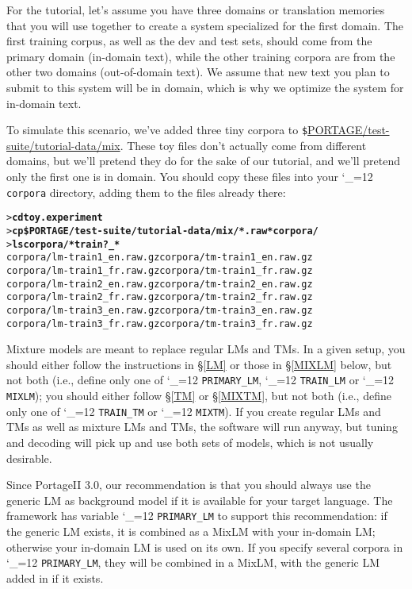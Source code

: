 \documentclass[11pt,letterpaper]{article}
\newcommand{\PS}{PortageII\xspace}
\def\code{\begingroup\catcode`\_=12 \codex}
\newcommand{\codex}[1]{\texttt{#1}\endgroup}
\begin{document}
For the tutorial, let's assume
you have three domains or translation memories that you will use
together to create a system specialized for the first domain.  The first
training corpus, as well as the dev and test sets, should come from the primary
domain (in-domain text), while the other training corpora are from the other two
domains (out-of-domain text).  We assume that new text you plan to submit to
this system will be in domain, which is why we optimize the system for
in-domain text.

To simulate this scenario, we've added three tiny corpora to
\verb"$"\url{PORTAGE/test-suite/tutorial-data/mix}.
These toy files don't actually come from different domains, but we'll pretend they do
for the sake of our tutorial, and we'll pretend only the first one is in
domain.  You should copy these files into your \code{corpora} directory, adding
them to the files already there:
\begin{small}
\begin{alltt}
   > \textbf{cd toy.experiment}
   > \textbf{cp \$PORTAGE/test-suite/tutorial-data/mix/*.raw* corpora/}
   > \textbf{ls corpora/*train?_*}
   corpora/lm-train1_en.raw.gz  corpora/tm-train1_en.raw.gz
   corpora/lm-train1_fr.raw.gz  corpora/tm-train1_fr.raw.gz
   corpora/lm-train2_en.raw.gz  corpora/tm-train2_en.raw.gz
   corpora/lm-train2_fr.raw.gz  corpora/tm-train2_fr.raw.gz
   corpora/lm-train3_en.raw.gz  corpora/tm-train3_en.raw.gz
   corpora/lm-train3_fr.raw.gz  corpora/tm-train3_fr.raw.gz
\end{alltt}
\end{small}

Mixture models are meant to replace regular LMs and TMs. In a given setup, you
should either follow the instructions in \S\ref{LM} or those in \S\ref{MIXLM}
below, but not both
(i.e., define only one of \code{PRIMARY_LM}, \code{TRAIN_LM} or \code{MIXLM});
you should either follow \S\ref{TM} or \S\ref{MIXTM}, but
not both
(i.e., define only one of \code{TRAIN_TM} or \code{MIXTM}).
If you create regular LMs and
TMs as well as mixture LMs and TMs, the software will run anyway, but tuning and
decoding will pick up and use both sets of models, which is not usually
desirable.

Since \PS 3.0, our recommendation is that you should always use the generic LM as
background model if it is available for your target language.  The framework
has variable \code{PRIMARY_LM} to support this recommendation: if the generic
LM exists, it is combined as a MixLM with your in-domain LM; otherwise your
in-domain LM is used on its own.
If you specify several corpora in \code{PRIMARY_LM}, they will be combined in a MixLM,
with the generic LM added in if it exists.
\end{document}

